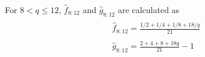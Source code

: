 \documentclass{sig-alternate}
\begin{document}
For $8 < q \leq 12$, $\hat{f}_{8:12}$ and $\hat{g}_{8:12}$ are calculated as
\begin{equation}
\begin{matrix}
\\ \hat{f}_{8:12} = \frac{1/2 + 1/4 + 1/8 + 18 / q} {21}
\\
\\ \hat{g}_{8:12} =  \frac{2 + 4 + 8 + 18q} {21} - 1
\end{matrix}
\label{eq:plot12}
\end{equation}


  
\end{document}
